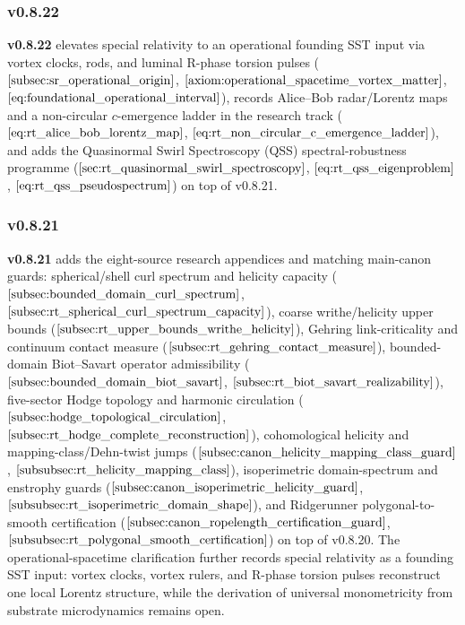 \documentclass[11pt]{article}
\theoremstyle{definition}
\theoremstyle{plain}
\theoremstyle{remark}
\begin{document}
        \subsubsection{v0.8.22}
            \textbf{v0.8.22} elevates special relativity to an operational founding SST input via vortex clocks, rods, and luminal R-phase torsion pulses (\(\ref{subsec:sr_operational_origin}\), \(\ref{axiom:operational_spacetime_vortex_matter}\), \(\ref{eq:foundational_operational_interval}\)), records Alice--Bob radar/Lorentz maps and a non-circular \(c\)-emergence ladder in the research track (\(\ref{eq:rt_alice_bob_lorentz_map}\), \(\ref{eq:rt_non_circular_c_emergence_ladder}\)), and adds the Quasinormal Swirl Spectroscopy (QSS) spectral-robustness programme (\(\ref{sec:rt_quasinormal_swirl_spectroscopy}\), \(\ref{eq:rt_qss_eigenproblem}\), \(\ref{eq:rt_qss_pseudospectrum}\)) on top of v0.8.21.

        \subsubsection{v0.8.21}
            \textbf{v0.8.21} adds the eight-source research appendices and matching main-canon guards: spherical/shell curl spectrum and helicity capacity (\(\ref{subsec:bounded_domain_curl_spectrum}\), \(\ref{subsec:rt_spherical_curl_spectrum_capacity}\)), coarse writhe/helicity upper bounds (\(\ref{subsec:rt_upper_bounds_writhe_helicity}\)), Gehring link-criticality and continuum contact measure (\(\ref{subsec:rt_gehring_contact_measure}\)), bounded-domain Biot--Savart operator admissibility (\(\ref{subsec:bounded_domain_biot_savart}\), \(\ref{subsec:rt_biot_savart_realizability}\)), five-sector Hodge topology and harmonic circulation (\(\ref{subsec:hodge_topological_circulation}\), \(\ref{subsec:rt_hodge_complete_reconstruction}\)), cohomological helicity and mapping-class/Dehn-twist jumps (\(\ref{subsec:canon_helicity_mapping_class_guard}\), \(\ref{subsubsec:rt_helicity_mapping_class}\)), isoperimetric domain-spectrum and enstrophy guards (\(\ref{subsec:canon_isoperimetric_helicity_guard}\), \(\ref{subsubsec:rt_isoperimetric_domain_shape}\)), and Ridgerunner polygonal-to-smooth certification (\(\ref{subsec:canon_ropelength_certification_guard}\), \(\ref{subsubsec:rt_polygonal_smooth_certification}\)) on top of v0.8.20. The operational-spacetime clarification further records special relativity as a founding SST input: vortex clocks, vortex rulers, and R-phase torsion pulses reconstruct one local Lorentz structure, while the derivation of universal monometricity from substrate microdynamics remains open.
\end{document}
